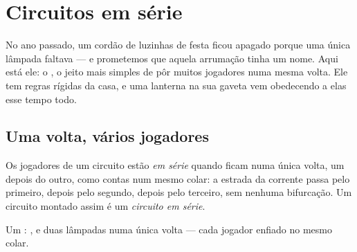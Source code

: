 \chapter{Circuitos em série}\label{ch:g4:series-circuits}

No ano passado, um cordão de luzinhas de festa ficou apagado porque
uma única lâmpada faltava --- e prometemos que aquela arrumação tinha
um nome. Aqui está ele: o , o jeito mais simples de
pôr muitos jogadores numa mesma volta. Ele tem regras rígidas da
casa, e uma lanterna na sua gaveta vem obedecendo a elas esse tempo
todo.

\section{Uma volta, vários jogadores}

\begin{definition}[Em série]\label{def:g4:series-circuits:series}
Os jogadores de um circuito estão \emph{em série} quando ficam numa única volta, um depois do outro, como contas
num mesmo colar: a estrada da corrente passa pelo primeiro, depois
pelo segundo, depois pelo terceiro, sem nenhuma bifurcação. Um
circuito montado assim é um \emph{circuito em série}.
\end{definition}

\begin{omfigure}

{\small Um : ,  e duas lâmpadas numa
única volta --- cada jogador enfiado no mesmo colar.}
\end{omfigure}

